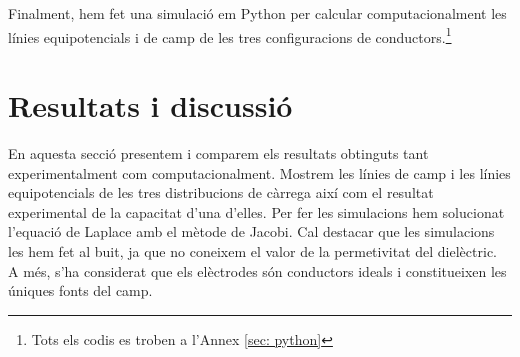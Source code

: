 \documentclass[11pt]{article}
\begin{document}
Finalment, hem fet una simulació em Python per calcular computacionalment les línies equipotencials i de camp de les tres configuracions de conductors.\footnote{\label{nota: codis}Tots els codis es troben a l'Annex \ref{sec: python}}

\section{Resultats i discussió}\label{sec: resultats}
En aquesta secció presentem i comparem els resultats obtinguts tant experimentalment com computacionalment. Mostrem les línies de camp i les línies equipotencials de les tres distribucions de càrrega així com el resultat experimental de la capacitat d'una d'elles. Per fer les simulacions hem solucionat l'equació de Laplace amb el mètode de Jacobi\footnotemark[3]. Cal destacar que les simulacions les hem fet al buit, ja que no coneixem el valor de la permetivitat del dielèctric. A més, s'ha considerat que els elèctrodes són conductors ideals i constitueixen les úniques fonts del camp.
\end{document}
